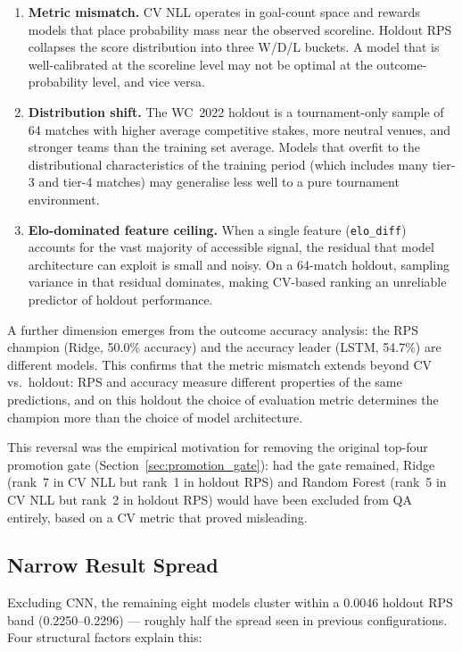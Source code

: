 \documentclass[conference]{IEEEtran}
\begin{document}
\begin{enumerate}
  \item \textbf{Metric mismatch.}  CV NLL operates in goal-count space
  and rewards models that place probability mass near the observed
  scoreline.  Holdout RPS collapses the score distribution into three
  W/D/L buckets.  A model that is well-calibrated at the scoreline level
  may not be optimal at the outcome-probability level, and vice versa.
  \item \textbf{Distribution shift.}  The WC~2022 holdout is a
  tournament-only sample of 64 matches with higher average competitive
  stakes, more neutral venues, and stronger teams than the training set
  average.  Models that overfit to the distributional characteristics of
  the training period (which includes many tier-3 and tier-4 matches) may
  generalise less well to a pure tournament environment.
  \item \textbf{Elo-dominated feature ceiling.}  When a single feature
  (\texttt{elo\_diff}) accounts for the vast majority of accessible signal,
  the residual that model architecture can exploit is small and noisy.  On a
  64-match holdout, sampling variance in that residual dominates, making
  CV-based ranking an unreliable predictor of holdout performance.
\end{enumerate}

A further dimension emerges from the outcome accuracy analysis: the RPS
champion (Ridge, 50.0\% accuracy) and the accuracy leader (LSTM, 54.7\%)
are different models.  This confirms that the metric mismatch extends
beyond CV vs.\ holdout: RPS and accuracy measure different properties of
the same predictions, and on this holdout the choice of evaluation metric
determines the champion more than the choice of model architecture.

This reversal was the empirical motivation for removing the original
top-four promotion gate (Section~\ref{sec:promotion_gate}): had the gate
remained, Ridge (rank~7 in CV NLL but rank~1 in holdout RPS) and Random
Forest (rank~5 in CV NLL but rank~2 in holdout RPS) would have been
excluded from QA entirely, based on a CV metric that proved misleading.

\subsection{Narrow Result Spread}

Excluding CNN, the remaining eight models cluster within a 0.0046 holdout
RPS band (0.2250--0.2296) --- roughly half the spread seen in previous
configurations.  Four structural factors explain this:
\end{document}
